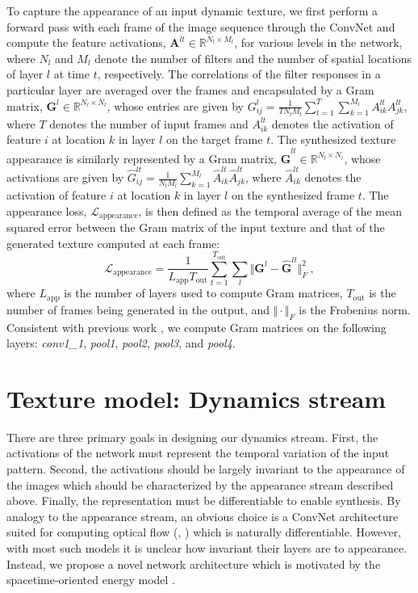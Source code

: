To capture the appearance of an input dynamic texture, we first
perform a forward pass with each frame of the image sequence
through the ConvNet and compute the feature activations,
$\mathbf{A}^{lt} \in \mathbb{R}^{N_l\times M_l}$, for various
levels in the network, where $N_l$ and $M_l$ denote
the number of filters and the number of spatial locations of layer
$l$ at time $t$, respectively.
The correlations of the filter responses in a particular layer are
averaged over the frames and encapsulated by a Gram matrix,
$\mathbf{G}^{l} \in \mathbb{R}^{N_l \times N_l}$, whose
entries are given by
$G_{ij}^l = \frac{1}{T N_l M_l} \sum_{t=1}^T \sum_{k=1}^{M_l} A_{ik}^{lt} A_{jk}^{lt}$,
where $T$ denotes the number of input frames
and $A_{ik}^{lt}$ denotes the activation of feature $i$ at
location $k$ in layer $l$ on the target frame $t$.
The synthesized texture appearance is similarly represented by a
Gram matrix, $\hat{\mathbf{G}}^{lt} \in \mathbb{R}^{N_l \times N_l}$,
whose activations are given by
$\hat{G}_{ij}^{lt} = \frac{1}{N_l M_l} \sum_{k=1}^{M_l} \hat{A}_{ik}^{lt} \hat{A}_{jk}^{lt}$,
where $\hat{A}_{ik}^{lt}$ denotes the activation of feature $i$ at
location $k$ in layer $l$ on the synthesized frame $t$.
The appearance loss, $\mathcal{L}_\text{appearance}$, is then 
defined as the temporal average of the mean squared error between
the Gram matrix of the input texture and that of the generated
texture computed at each frame:
\begin{equation}
   \mathcal{L}_\text{appearance} = \frac{1}{L_\text{app} T_\text{out}} \sum_{t=1}^{T_\text{out}} \sum_{l} \Vert \mathbf{G}^l - \hat{\mathbf{G}}^{lt} \Vert^2_F\ ,
   \label{eq:apploss}
\end{equation}
where $L_\text{app}$ is the number of layers used to compute Gram
matrices, $T_\text{out}$ is the number of frames being generated in
the output, and $\Vert \cdot \Vert_F$ is the Frobenius norm.
Consistent with previous work \cite{gatys2015}, we compute Gram matrices on the
following layers: 
\emph{conv1\_1}, \emph{pool1}, \emph{pool2}, \emph{pool3}, and \emph{pool4}.

\section{Texture model: Dynamics stream}

There are three primary goals in designing our dynamics stream.
First, the activations of the network must 
represent the temporal variation of the input pattern.
Second, the activations should be largely invariant to the
appearance of the images which should be characterized
by the appearance stream described above.
Finally, the representation must be differentiable to enable 
synthesis.
By analogy to the appearance stream, an obvious choice
is a ConvNet architecture suited for computing
optical flow (\eg, \cite{dosovitskiy2015,ilg2017}) which
is naturally differentiable.
However, with most such models it is unclear how invariant
their layers are to appearance.
Instead, we propose a novel network architecture which is
motivated by the spacetime-oriented energy model
\cite{derpanis2012spacetime,simoncelli1998}.

